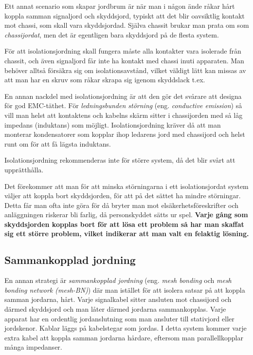 Ett annat scenario som skapar jordbrum är när man i någon ände råkar hårt
koppla samman signaljord och skyddsjord, typiskt att det blir oavsiktlig
kontakt mot chassi, som skall vara skyddsjordad. Själva chassit brukar man
prata om som \emph{chassijordat}, men det är egentligen bara skyddsjord på de
flesta system.

För att isolationsjordning skall fungera måste alla kontakter vara isolerade
från chassit, och även signaljord får inte ha kontakt med chassi inuti
apparaten. Man behöver alltså försäkra sig om isolationsavstånd, vilket
väldigt lätt kan missas av att man har en skruv som råkar skrapa sig igenom
skyddslack t.ex.

En annan nackdel med isolationsjordning är att den gör det svårare att designa
för god EMC-täthet. För \emph{ledningsbunden störning} (eng. \emph{conductive
emission}) så vill man helst att kontaktens och kabelns skärm sitter i
chassijorden med så låg impedans (induktans) som möjligt. Isolationsjordning
kräver då att man monterar kondensatorer som kopplar ihop ledarens jord med chassijord och helst runt om för att få lägsta induktans.

Isolationsjordning rekommenderas inte för större system, då det blir svårt
att upprätthålla.

Det förekommer att man för att minska störningarna i ett isolationsjordat
system väljer att koppla bort skyddsjorden, för att på det sättet ha mindre
störningar. Detta får man ofta inte göra för då bryter man mot
elsäkerhetsföreskrifter och anläggningen riskerar bli farlig, då personskyddet
sätts ur spel. \textbf{Varje gång som skyddsjorden kopplas bort för att lösa ett
problem så har man skaffat sig ett större problem, vilket indikerar att man
valt en felaktig lösning.}

\subsection{Sammankopplad jordning}

En annan strategi är \emph{sammankopplad jordning} (eng. \emph{mesh bonding}
och \emph{mesh bonding network (mesh-BN)}) \cite[3.2.3]{K27-1991}
där man istället för att isolera satsar på att koppla samman jordarna, hårt.
Varje signalkabel sitter ansluten mot chassijord och därmed skyddsjord och
man låter därmed jordarna sammankopplas. Varje apparat har en ordentlig
jordanslutning som man ansluter till stativjord eller jordskenor. Kablar läggs
på kabelstegar som jordas. I detta system kommer varje extra kabel att koppla samman jordarna hårdare, eftersom man parallellkopplar många impedanser.

